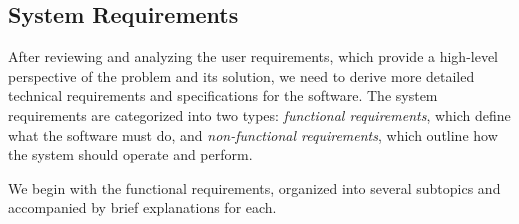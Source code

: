 \documentclass{article}
\begin{document}
\subsection{System Requirements}

After reviewing and analyzing the user requirements, which provide a high-level perspective of the problem and its solution, we need to derive more detailed technical requirements and specifications for the software. The system requirements are categorized into two types: \textit{functional requirements}, which define what the software must do, and \textit{non-functional requirements}, which outline how the system should operate and perform.

We begin with the functional requirements, organized into several subtopics and accompanied by brief explanations for each.
\end{document}
